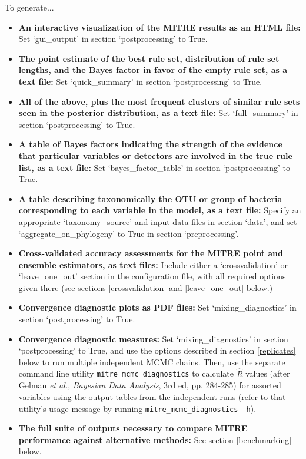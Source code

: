 \documentclass[12pt]{report}
\begin{document}
To generate...
\begin{itemize}
\item \textbf{An interactive visualization of the MITRE results as an
  HTML file:} Set `gui\_output' in section `postprocessing' to True.
\item \textbf{The point estimate of the best rule set, distribution of
  rule set lengths, and the Bayes factor in favor of the empty rule
  set, as a text file:} Set `quick\_summary' in section
  `postprocessing' to True.
\item \textbf{All of the above, plus the most frequent clusters of
  similar rule sets seen in the posterior distribution, as a text
  file:} Set `full\_summary' in section `postprocessing' to True.
\item \textbf{A table of Bayes factors indicating the strength of the
  evidence that particular variables or detectors are involved in the
  true rule list, as a text file:} Set `bayes\_factor\_table' in
  section `postprocessing' to True.
\item \textbf{A table describing taxonomically the OTU or group of
  bacteria corresponding to each variable in the model, as a text
  file:} Specify an appropriate `taxonomy\_source' and input data
  files in section `data', and set `aggregate\_on\_phylogeny' to True
  in section `preprocessing'.
\item \textbf{Cross-validated accuracy assessments for the MITRE point
  and ensemble estimators, as text files:} Include either a `crossvalidation' or
  `leave\_one\_out' section in the configuration file, with all
  required options given there (see sections \ref{crossvalidation} and
  \ref{leave_one_out} below.)
\item \textbf{Convergence diagnostic plots as PDF files:} Set
  `mixing\_diagnostics' in section `postprocessing' to True.
\item \textbf{Convergence diagnostic measures:} Set
  `mixing\_diagnostics' in section `postprocessing' to True, and use
  the options described in section \ref{replicates} below to run
  multiple independent MCMC chains. Then, use the separate command
  line utility \texttt{mitre\_mcmc\_diagnostics} to calculate $\hat R$
  values (after Gelman \textit{et al.}, \textit{Bayesian Data
    Analysis}, 3rd ed, pp. 284-285) for assorted variables using the
  output tables from the independent runs (refer to that utility's
  usage message by running \texttt{mitre\_mcmc\_diagnostics -h}).
\item \textbf{The full suite of outputs necessary to compare MITRE
  performance against alternative methods:} See section
  \ref{benchmarking} below.
\end{itemize}
\end{document}
